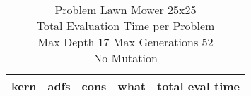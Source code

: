 \begin{table}[H]
\caption{Problem  Lawn Mower 25x25\\Total Evaluation Time per Problem \\ Max Depth 17 Max Generations 52\\ No Mutation \\}
\begin{center}
\scalebox{1.0} %
{
\begin{tabular}{llllr}
\hline
kern & adfs & cons & what & total eval time \\
\hline


\end{tabular}
}
\end{center}
\end{table}

